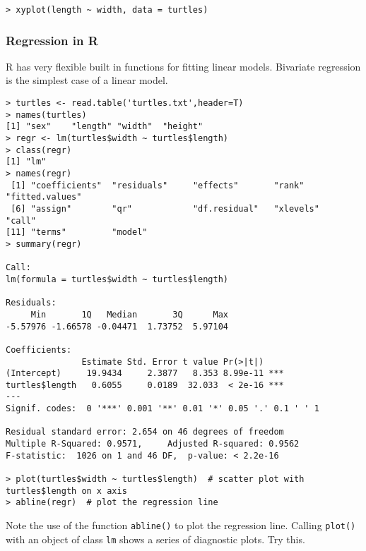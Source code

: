 \begin{lstlisting}
> xyplot(length ~ width, data = turtles)
\end{lstlisting}
\subsubsection{Regression in R}

R has very flexible built in functions for fitting linear models.
Bivariate regression is the simplest case of a linear model.

\begin{lstlisting}
> turtles <- read.table('turtles.txt',header=T)
> names(turtles)
[1] "sex"    "length" "width"  "height"
> regr <- lm(turtles$width ~ turtles$length)
> class(regr)
[1] "lm"
> names(regr)
 [1] "coefficients"  "residuals"     "effects"       "rank"          "fitted.values"
 [6] "assign"        "qr"            "df.residual"   "xlevels"       "call"         
[11] "terms"         "model"   
> summary(regr)

Call:
lm(formula = turtles$width ~ turtles$length)

Residuals:
     Min       1Q   Median       3Q      Max 
-5.57976 -1.66578 -0.04471  1.73752  5.97104 

Coefficients:
               Estimate Std. Error t value Pr(>|t|)    
(Intercept)     19.9434     2.3877   8.353 8.99e-11 ***
turtles$length   0.6055     0.0189  32.033  < 2e-16 ***
---
Signif. codes:  0 '***' 0.001 '**' 0.01 '*' 0.05 '.' 0.1 ' ' 1 

Residual standard error: 2.654 on 46 degrees of freedom
Multiple R-Squared: 0.9571,     Adjusted R-squared: 0.9562 
F-statistic:  1026 on 1 and 46 DF,  p-value: < 2.2e-16 

> plot(turtles$width ~ turtles$length)  # scatter plot with turtles$length on x axis
> abline(regr)  # plot the regression line
\end{lstlisting}
Note the use of the function \lstinline!abline()! to plot the regression
line. Calling \lstinline!plot()! with an object of class \lstinline!lm!
shows a series of diagnostic plots. Try this.

